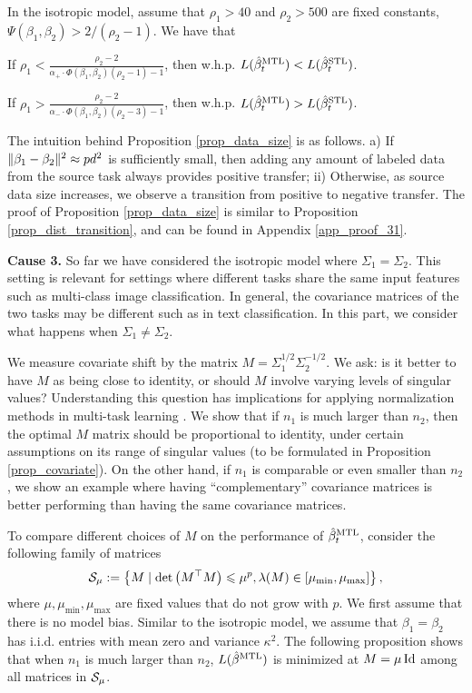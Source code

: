\begin{proposition}\label{prop_data_size}
	In the isotropic model, assume that $\rho_1 > 40$ and $\rho_2 > 500$ are fixed constants, $\Psi(\beta_1, \beta_2) > 2/(\rho_2 - 1)$.
	We have that
	\squishlist
		\item If $\rho_1 < \frac{\rho_2-2}{\alpha_+ \cdot \Phi(\beta_1, \beta_2) (\rho_2 - 1) - 1}$, then w.h.p. $L(\hat{\beta}_t^{\text{MTL}}) < L(\hat{\beta}_t^{\text{STL}})$.
		\item If $\rho_1 > \frac{\rho_2-2}{\alpha_- \cdot \Phi(\beta_1, \beta_2) (\rho_2 - 3) - 1}$, then w.h.p. $L(\hat{\beta}_t^{\text{MTL}}) > L(\hat{\beta}_t^{\text{STL}})$.
	\squishend
\end{proposition}
The intuition behind Proposition \ref{prop_data_size} is as follows.
a) If $\|\beta_1 - \beta_2\|^2 \approx pd^2$ is sufficiently small, then adding any amount of labeled data from the source task always provides positive transfer;
ii) Otherwise, as source data size increases, we observe a transition from positive to negative transfer.
The proof of Proposition \ref{prop_data_size} is similar to Proposition \ref{prop_dist_transition}, and can be found in Appendix \ref{app_proof_31}.

\textbf{Cause 3.}
So far we have considered the isotropic model where $\Sigma_1 = \Sigma_2$.
This setting is relevant for settings where different tasks share the same input features such as multi-class image classification.
In general, the covariance matrices of the two tasks may be different such as in text classification.
In this part, we consider what happens when $\Sigma_1 \neq \Sigma_2$.

We measure covariate shift by the matrix $M = \Sigma_1^{1/2} \Sigma_2^{-1/2}$.
We ask: is it better to have $M$ as being close to identity, or should $M$ involve varying levels of singular values?
Understanding this question has implications for applying normalization methods in multi-task learning \cite{LV19,CBLR18,YKGLHF20}.
We show that if $n_1$ is much larger than $n_2$, then the optimal $M$ matrix should be proportional to identity, under certain assumptions on its range of singular values (to be formulated in Proposition \ref{prop_covariate}).
On the other hand, if $n_1$ is comparable or even smaller than $n_2$, we show an example where having ``complementary'' covariance matrices is better performing than having the same covariance matrices.

	To compare different choices of $M$ on the performance of $\hat{\beta}_t^{\text{MTL}}$, consider the following family of matrices
	\begin{align*}
		\mathcal{S}_{\mu}:=\left\{ M \mid \det\left({ M^\top M}\right) \leqslant \mu^p, \lambda(M) \in [\mu_{\min}, \mu_{\max}] \right\},
	\end{align*}
	where $\mu, \mu_{\min}, \mu_{\max}$ are fixed values that do not grow with $p$. We first assume that there is no model bias. 
	Similar to the isotropic model, we assume that $\beta_1=\beta_2$ has i.i.d. entries with mean zero and variance $\kappa^2$.
	The following proposition shows that when $n_1$ is much larger than $n_2$, $L(\hat{\beta}^{\text{MTL}})$ is minimized at $M = \mu\operatorname{Id}$ among all matrices in $\mathcal{S}_{\mu}$.


